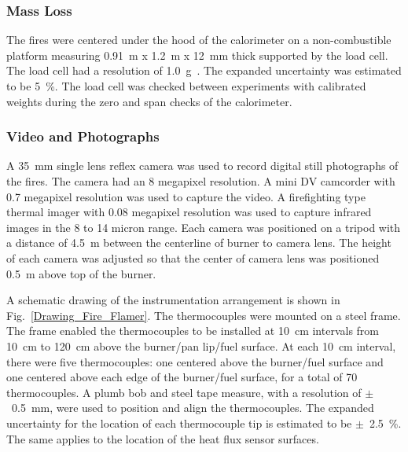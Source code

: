 \documentclass[twoside]{uocthesis}
\begin{document}
{\subsubsection{Mass Loss}

The fires were centered under the hood of the calorimeter on a non-combustible platform measuring 0.91~m x 1.2~m x 12~mm thick supported by the load cell.  The load cell had a resolution of 1.0~g~\cite{Mettler}. The expanded uncertainty was estimated to be 5~\%.  The load cell was checked between experiments with calibrated weights during the zero and span checks of the calorimeter.

\subsubsection{Video and Photographs}

A 35~mm single lens reflex camera was used to record digital still photographs of the fires.  The camera had an 8 megapixel resolution.  A mini DV camcorder with 0.7 megapixel resolution was used to capture the video.  A firefighting type thermal imager with 0.08 megapixel resolution was used to capture infrared images in the 8 to 14 micron range.  Each camera was positioned on a tripod with a distance of 4.5~m between the centerline of burner to camera lens.  The height of each camera was adjusted so that the center of camera lens was positioned 0.5~m above top of the burner.

A schematic drawing of the instrumentation arrangement is shown in Fig.~\ref{Drawing_Fire_Flamer}.  The thermocouples were mounted on a steel frame.  The frame enabled the thermocouples to be installed at 10~cm intervals from 10~cm to 120~cm above the burner/pan lip/fuel surface. At each 10~cm interval, there were five thermocouples: one centered above the burner/fuel surface and one centered above each edge of the burner/fuel surface, for a total of 70 thermocouples.  A plumb bob and steel tape measure, with a resolution of $\pm$~0.5~mm, were used to position and align the thermocouples.   The expanded uncertainty for the location of each thermocouple tip is estimated to be $\pm$~2.5~\%.  The same applies to the location of the heat flux sensor surfaces.

}
\end{document}
